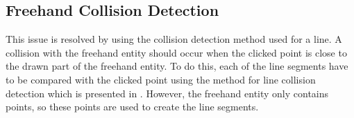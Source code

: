 \subsection{Freehand Collision Detection}
This issue is resolved by using the collision detection method used for a line.
A collision with the freehand entity should occur when the clicked point is close to the drawn part of the freehand entity.
To do this, each of the line segments have to be compared with the clicked point using the method for line collision detection which is presented in .
However, the freehand entity only contains points, so these points are used to create the line segments.